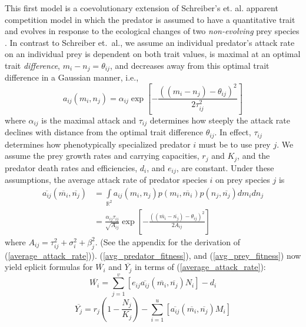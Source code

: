\documentclass{amsart}
\theoremstyle{definition}
\theoremstyle{remark}
\numberwithin{equation}{section}
\begin{document}
This first model is a coevolutionary extension of Schreiber's et. al. apparent competition model in which the predator is assumed to have a quantitative trait and evolves in response to the ecological changes of two {\it non-evolving} prey species \cite{Schreiber_2011}.  In contrast to Schreiber et.~al., we assume an individual predator's attack rate on an individual prey is dependent on both trait values, is maximal at an optimal trait {\it difference}, $m_i - n_j = \theta_{ij}$, and decreases away from this optimal trait difference in a Gaussian manner, i.e.,
\begin{equation}
	\label{attack_rate}
	a_{ij}(m_i, n_j) = \alpha_{ij}\exp{\left[-\frac{((m_i - n_j) - \theta_{ij})^2}{2\tau_{ij}^2}\right]}
\end{equation}
where $\alpha_{ij}$ is the maximal attack and $\tau_{ij}$ determines how steeply the attack rate declines with distance from the optimal trait difference $\theta_{ij}$.  In effect, $\tau_{ij}$ determines how phenotypically specialized predator $i$ must be to use prey $j$.  We assume the prey growth rates and carrying capacities, $r_j$ and $K_j$, and the predator death rates and efficiencies, $d_i$, and $e_{ij}$, are constant.  Under these assumptions, the average attack rate of predator species $i$ on prey species $j$ is
\begin{equation}
	\label{average_attack_rate}
	\begin{aligned}
		\overline{a_{ij}}(\overline{m_i}, \overline{n_j}) &= \int\limits_{\mathbb{R}^2}a_{ij}(m_i, n_j)p(m_i, \overline{m_i})p(n_j, \overline{n_j})dm_idn_j \\
		&= \frac{\alpha_{ij}\tau_{ij}}{\sqrt{A_{ij}}}\exp{\left[-\frac{((\overline{m_i} - \overline{n_j}) - \theta_{ij})^2}{2A_{ij}}\right]}
	\end{aligned}
\end{equation}
where $A_{ij} = \tau_{ij}^2 + \sigma_i^2 + \beta_j^2$.  (See the appendix for the derivation of (\ref{average_attack_rate})).  (\ref{avg_predator_fitness}), and (\ref{avg_prey_fitness}) now yield eplicit formulas for $\overline{W_i}$ and $\overline{Y_j}$ in terms of (\ref{average_attack_rate}):
\begin{equation}
	\label{model_1_avg_pred_fitness}
	\overline{W_i} = \sum\limits_{j = 1}^{v}\left[e_{ij}\overline{a_{ij}}(\overline{m_i}, \overline{n_j})N_i\right] - d_i
\end{equation}
\begin{equation}
	\label{model_1_avg_prey_fitness}
	\overline{Y_j} = r_j\left(1 - \frac{N_j}{K_j}\right) - \sum\limits_{i = 1}^{u}\left[\overline{a_{ij}}(\overline{m_i}, \overline{n_j})M_i\right]
\end{equation}
\end{document}
